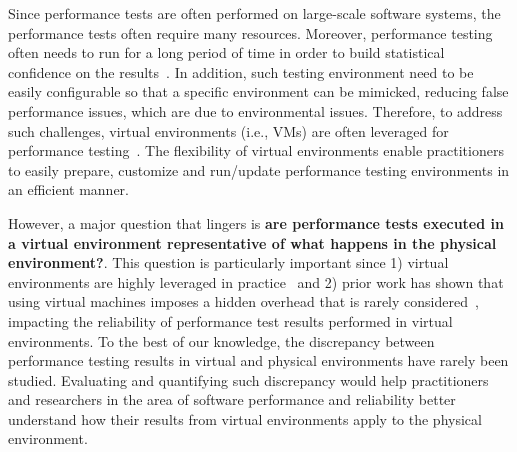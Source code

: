 

Since performance tests are often performed on large-scale software systems, the performance tests often require many resources. Moreover, performance testing often needs to run for a long period of time in order to build statistical confidence on the results~\cite{ranjanbook}. In addition, such testing environment need to be easily configurable so that a specific environment can be mimicked, reducing false performance issues, which are due to environmental issues. Therefore, to address such challenges, virtual environments (i.e., VMs) are often leveraged for performance testing~\cite{whyvirtualisbetter, vmwarehighcost}. The flexibility of virtual environments enable practitioners to easily prepare, customize and run/update performance testing environments in an efficient manner.



However, a major question that lingers is \textbf{are performance tests executed in a virtual environment representative of what happens in the physical environment?}. This question is particularly important since 1) virtual environments are highly leveraged in practice~\cite{Nguyen:2012:ADP:2188286.2188344,xiong2013vperfguard} and 2) prior work has shown that using virtual machines imposes a hidden overhead that is rarely considered~\cite{menon2005diagnosing}, impacting the reliability of performance test results performed in virtual environments. To the best of our knowledge, the discrepancy between performance testing results in virtual and physical environments have rarely been studied. Evaluating and quantifying such discrepancy would help practitioners and researchers in the area of software performance and reliability better understand how their results from virtual environments apply to the physical environment.


